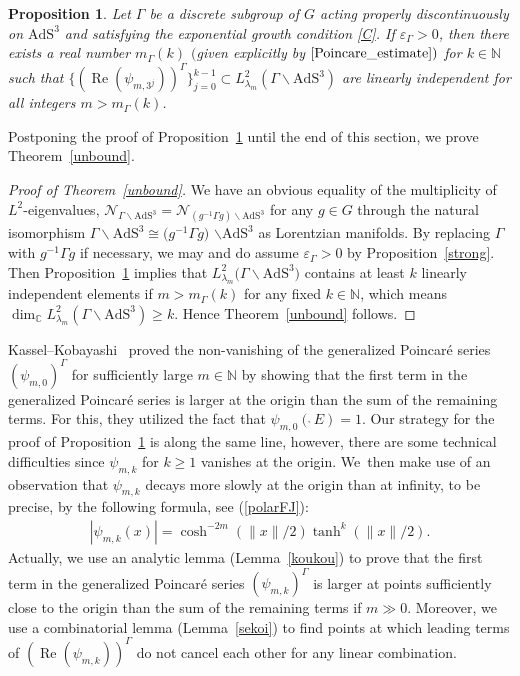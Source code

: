 \documentclass[11pt]{article}
\numberwithin{equation}{section}
\numberwithin{equation}{section}
\newtheorem{Proposition}[Theorem]{Proposition}
\begin{document}
\begin{Proposition}
\label{mainthm}
Let $\Gamma$ be a discrete subgroup of $G$ acting properly discontinuously
on $\mathrm{AdS}^{3}$
and satisfying the exponential growth condition \eqref{C}.
If $\varepsilon_{\Gamma}>0$,
then there exists a real number $m_{\Gamma}(k)$
$($given explicitly by $\eqref{Poincare_estimate})$
for $k\in \mathbb{N}$
such that
$\{(\operatorname{Re}(\psi_{m,3^{j}}))^{\Gamma}\}_{j=0}^{k-1}
\subset L^2_{\lambda_{m}}(\Gamma\backslash\mathrm{AdS}^{3})$
are linearly independent
for all integers $m > m_{\Gamma}(k)$.
\end{Proposition}

Postponing the proof of Proposition~\ref{mainthm} until the end of this section,
we prove Theorem~\ref{unbound}.

\begin{proof}[Proof of Theorem~\ref{unbound}]
We have an obvious equality of the multiplicity of $L^2$-eigenvalues,
$\mathcal{N}_{\Gamma\backslash\mathrm{AdS}^{3}} =
\mathcal{N}_{(g^{-1}\Gamma g)\backslash\mathrm{AdS}^{3}}$
for any $g\in G$
through the natural isomorphism
$\Gamma\backslash\mathrm{AdS}^{3} \cong
\big(g^{-1}\Gamma g\big)$ $\backslash\mathrm{AdS}^{3}$ as Lorentzian manifolds.
By replacing $\Gamma$ with $g^{-1}\Gamma g$ if necessary,
we may and do assume $\varepsilon_{\Gamma}>0$ by Proposition~\ref{strong}.
Then Proposition~\ref{mainthm} implies that
$L^2_{\lambda_{m}}\big(\Gamma\backslash \mathrm{AdS}^{3}\big)$ contains at least
$k$ linearly independent elements
if $m>m_{\Gamma}(k)$ for any fixed $k\in\mathbb{N}$,
which means
$\dim_{\mathbb{C}} L^2_{\lambda_{m}}(\Gamma\backslash\mathrm{AdS}^{3})
\geq k.$
Hence Theorem~\ref{unbound} follows.
\end{proof}

Kassel--Kobayashi~\cite{KaKob16} proved the non-vanishing of
the generalized Poincar\'e series $(\psi_{m,0})^{\Gamma}$
for sufficiently large $m\in\mathbb{N}$
by showing that the first term in the generalized Poincar\'e series
is larger at the origin than the sum of the remaining terms.
For this, they utilized the fact that $\psi_{m,0}(\grave{\ }E)=1$.
Our strategy for the proof of Proposition~\ref{mainthm} is along the same line,
however, there are some technical difficulties
since $\psi_{m,k}$ for $k\geq1$ vanishes at the origin. We~then make use of an observation that
$\psi_{m,k}$ decays more slowly at the origin than at infinity,
to be precise, by the following formula, see (\ref{polarFJ}):
\begin{gather*}
|\psi_{m,k}(x)|=\cosh^{-2m}(\|x\|/2) \tanh^{k}(\|x\|/2).
\end{gather*}
Actually, we use an analytic lemma (Lemma~\ref{koukou})
to prove that the first term in the generalized Poincar\'e series $(\psi_{m,k})^{\Gamma}$
is larger at points sufficiently close to the origin
than the sum of the remaining terms if $m\gg0$.
Moreover,
we use a combinatorial lemma (Lemma~\ref{sekoi})
to find points at which
leading terms of
$(\operatorname{Re}(\psi_{m,k}))^{\Gamma}$
do not cancel each other for any linear combination.
\end{document}
